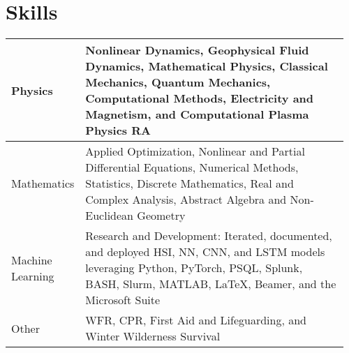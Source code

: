 \documentclass[letterpaper,11pt]{article}
\begin{document}
\section{\color{cvblue}Skills}
\vspace{-.25in}
\begin{table}[h!]
    \setlength{\tabcolsep}{8pt}
    \renewcommand{\arraystretch}{2}
    \centering
    \begin{tabular}{p{0.16\linewidth} || p{0.8\linewidth}}
        Physics& Nonlinear Dynamics, Geophysical Fluid Dynamics, Mathematical Physics, Classical Mechanics,
        Quantum Mechanics, Computational Methods, Electricity and Magnetism, and Computational Plasma Physics RA \\\hline
        Mathematics& Applied Optimization, Nonlinear and Partial Differential Equations, Numerical Methods, Statistics, Discrete Mathematics, Real and Complex Analysis, Abstract Algebra and Non-Euclidean Geometry \\\hline
        Machine Learning & Research and Development: Iterated, documented, and deployed HSI, NN, CNN, and LSTM models leveraging Python, PyTorch, PSQL, Splunk, BASH, Slurm, MATLAB, \LaTeX,  Beamer, and the Microsoft Suite \\\hline
        Other& WFR, CPR, First Aid and Lifeguarding, and Winter Wilderness Survival\\\hline
    \end{tabular}
\end{table}




    \setlength{\itemsep}{-.5pt}
\end{document}
